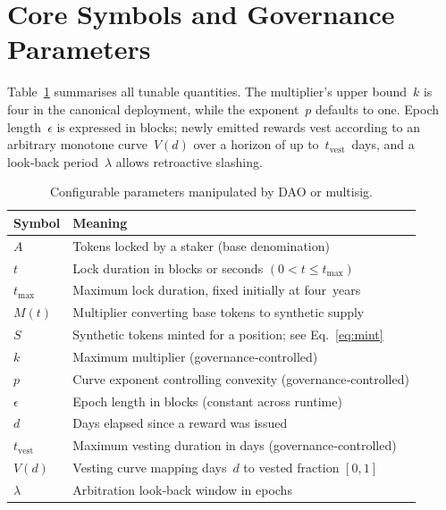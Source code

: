 \documentclass[11pt]{article}
\begin{document}
\section{Core Symbols and Governance Parameters}
Table~\ref{tab:params} summarises all tunable quantities. The multiplier’s upper bound~\(k\) is four in the canonical deployment, while the exponent~\(p\) defaults to one.  Epoch length~\(\epsilon\) is expressed in blocks; newly emitted rewards vest according to an arbitrary monotone curve~\(V(d)\) over a horizon of up to~\(t_{\text{vest}}\)~days, and a look‑back period~\(\lambda\) allows retroactive slashing.
\begin{table}[h]
\centering
\begin{tabular}{@{}ll@{}}
\toprule
Symbol & Meaning \\ \midrule
\(A\) & Tokens locked by a staker (base denomination) \\ 
\(t\) & Lock duration in blocks or seconds \((0<t\le t_{\max})\) \\ 
\(t_{\max}\) & Maximum lock duration, fixed initially at four years \\ 
\(M(t)\) & Multiplier converting base tokens to synthetic supply \\ 
\(S\) & Synthetic tokens minted for a position; see Eq.~\eqref{eq:mint} \\ 
\(k\) & Maximum multiplier (governance‑controlled) \\ 
\(p\) & Curve exponent controlling convexity (governance‑controlled) \\ 
\(\epsilon\) & Epoch length in blocks (constant across runtime) \\ 
\(d\) & Days elapsed since a reward was issued \\ 
\(t_{\text{vest}}\) & Maximum vesting duration in days (governance‑controlled) \\ 
\(V(d)\) & Vesting curve mapping days~\(d\) to vested fraction \([0,1]\) \\ 
\(\lambda\) & Arbitration look‑back window in epochs \\ \bottomrule
\end{tabular}
\caption{Configurable parameters manipulated by DAO or multisig.}
\label{tab:params}
\end{table}

\end{document}
